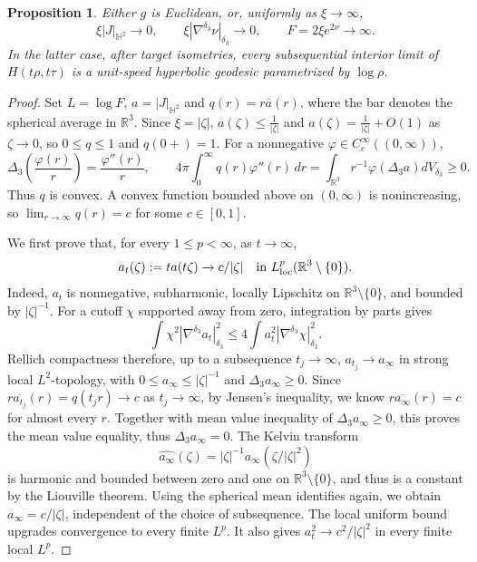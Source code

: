 \documentclass[letterpaper]{amsart}
\newtheorem{prop}[thm]{Proposition}
\theoremstyle{definition}
\theoremstyle{remark}
\begin{document}
\begin{prop}\label{notes-charge}
Either $g$ is Euclidean, or, uniformly as $\xi\to\infty$,
$$
 \xi |J|_{\mathbb{H}^2}\to 0,\qquad
 \xi|\nabla^{\delta_3}\nu|_{\delta_3}\to 0,
 \qquad F= 2 \xi e ^{2 \nu }\to \infty.
$$
In the latter case, after target isometries, every subsequential interior limit
of $H(t\rho,t\tau)$ is a unit-speed hyperbolic geodesic parametrized by $\log\rho$.
\end{prop}
\begin{proof}
Set $L= \log F$, $a = |J|_{\mathbb{H}^2}$ and $q(r)=r\bar a(r)$, where the bar denotes the spherical average in
$\mathbb R^3$. Since $\xi =|\zeta |$, $a(\zeta ) \leq \frac{1}{|\zeta |}$ and $a(\zeta ) = \frac{1}{|\zeta |} + O(1)$ as $\zeta \to 0$, so $0\le q\le1$ and $q(0+)=1$.
For a nonnegative $\varphi\in C_c^\infty((0,\infty))$,
\[
	\Delta_3\left(\frac{\varphi(r)}{r}\right)
	=\frac{\varphi''(r)}{r},
 \qquad
 4\pi\int_0^\infty q(r)\varphi''(r)\,dr = \int_{\mathbb{R}^3} r ^{-1} \varphi (\Delta _3 a) dV_{\delta _3} \ge0.
\]
Thus $q$ is convex. A convex function bounded above on $(0,\infty)$ is
nonincreasing, so $\lim_{r\to \infty}  q(r)= c$ for some $c\in[0,1]$.

We first prove that, for every $1\le p<\infty$, as $t\to \infty$,
\begin{equation}\label{notes-charge-Lp}
 a_t(\zeta):=t a(t\zeta)\to  c/|\zeta|
 \quad\hbox{in }L^p_{\mathrm{loc}}(\mathbb R^3\setminus\{0\}).
\end{equation}
Indeed, $a_t$ is nonnegative, subharmonic, locally Lipschitz on $\mathbb{R}^3 \setminus \{0\} $, and bounded by $|\zeta|^{-1}$.
For a cutoff $\chi $ supported away from zero, integration by parts gives
\[
 \int\chi^2|\nabla^{\delta_3}a_t|_{\delta_3}^2
       \le4\int a_t^2|\nabla^{\delta_3}\chi|_{\delta_3}^2.
\]
Rellich compactness therefore, up to a subsequence $t_j \to \infty$, $a_{t_j} \to a_\infty$ in strong local $L^2$-topology, with $0\le a_\infty \le|\zeta|^{-1}$ and $\Delta_3 a_\infty \ge0$. Since
$r\overline{a_{t_j}}(r)=q(t_j r)\to c$ as $t_j\to \infty$, by Jensen’s inequality, we know $r \overline{a_\infty} (r) = c$ for almost every
$r$. Together with mean value inequality of $\Delta _3 a_\infty \geq 0$, this proves the mean value equality, thus $\Delta _3 a_\infty =0$. The Kelvin
transform
\[
	\widehat {a_\infty}(\zeta)=|\zeta|^{-1}a_\infty(\zeta/|\zeta|^2)
\]
is harmonic and bounded between zero and one on $\mathbb R^3\setminus\{0\}$, and thus is a constant by the Liouville theorem. 
Using the spherical mean identifies again, we obtain $a_\infty = c/|\zeta|$, independent of the choice of subsequence. The local uniform bound upgrades convergence to every
finite $L^p$. It also gives $a_t^2\to c^2/|\zeta|^2$ in every finite local $L^p$.


\end{proof}
\end{document}
